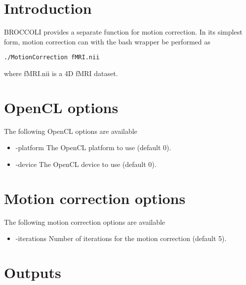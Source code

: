 \section{Introduction}

BROCCOLI provides a separate function for motion correction. In its simplest form, motion correction can with the bash wrapper be performed as

\begin{verbatim}
./MotionCorrection fMRI.nii
\end{verbatim}

where fMRI.nii is a 4D fMRI dataset.

\section{OpenCL options}

The following OpenCL options are available

\begin{itemize}

\item -platform
\newline \newline The OpenCL platform to use (default 0).

\item -device
\newline \newline The OpenCL device to use (default 0).

\end{itemize}

\section{Motion correction options}

The following motion correction options are available

\begin{itemize}

\item -iterations  
\newline \newline Number of iterations for the motion correction (default 5). 

\end{itemize}

\section{Outputs}

